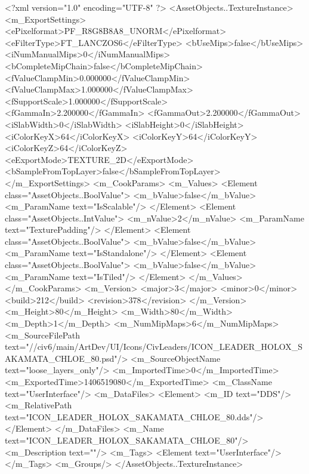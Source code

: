 <?xml version="1.0" encoding="UTF-8" ?>
<AssetObjects..TextureInstance>
	<m_ExportSettings>
		<ePixelformat>PF_R8G8B8A8_UNORM</ePixelformat>
		<eFilterType>FT_LANCZOS6</eFilterType>
		<bUseMips>false</bUseMips>
		<iNumManualMips>0</iNumManualMips>
		<bCompleteMipChain>false</bCompleteMipChain>
		<fValueClampMin>0.000000</fValueClampMin>
		<fValueClampMax>1.000000</fValueClampMax>
		<fSupportScale>1.000000</fSupportScale>
		<fGammaIn>2.200000</fGammaIn>
		<fGammaOut>2.200000</fGammaOut>
		<iSlabWidth>0</iSlabWidth>
		<iSlabHeight>0</iSlabHeight>
		<iColorKeyX>64</iColorKeyX>
		<iColorKeyY>64</iColorKeyY>
		<iColorKeyZ>64</iColorKeyZ>
		<eExportMode>TEXTURE_2D</eExportMode>
		<bSampleFromTopLayer>false</bSampleFromTopLayer>
	</m_ExportSettings>
	<m_CookParams>
		<m_Values>
			<Element class="AssetObjects..BoolValue">
				<m_bValue>false</m_bValue>
				<m_ParamName text="IsScalable"/>
			</Element>
			<Element class="AssetObjects..IntValue">
				<m_nValue>2</m_nValue>
				<m_ParamName text="TexturePadding"/>
			</Element>
			<Element class="AssetObjects..BoolValue">
				<m_bValue>false</m_bValue>
				<m_ParamName text="IsStandalone"/>
			</Element>
			<Element class="AssetObjects..BoolValue">
				<m_bValue>false</m_bValue>
				<m_ParamName text="IsTiled"/>
			</Element>
		</m_Values>
	</m_CookParams>
	<m_Version>
		<major>3</major>
		<minor>0</minor>
		<build>212</build>
		<revision>378</revision>
	</m_Version>
	<m_Height>80</m_Height>
	<m_Width>80</m_Width>
	<m_Depth>1</m_Depth>
	<m_NumMipMaps>6</m_NumMipMaps>
	<m_SourceFilePath text="//civ6/main/ArtDev/UI/Icons/CivLeaders/ICON_LEADER_HOLOX_SAKAMATA_CHLOE_80.psd"/>
	<m_SourceObjectName text="loose_layers_only"/>
	<m_ImportedTime>0</m_ImportedTime>
	<m_ExportedTime>1406519080</m_ExportedTime>
	<m_ClassName text="UserInterface"/>
	<m_DataFiles>
		<Element>
			<m_ID text="DDS"/>
			<m_RelativePath text="ICON_LEADER_HOLOX_SAKAMATA_CHLOE_80.dds"/>
		</Element>
	</m_DataFiles>
	<m_Name text="ICON_LEADER_HOLOX_SAKAMATA_CHLOE_80"/>
	<m_Description text=""/>
	<m_Tags>
		<Element text="UserInterface"/>
	</m_Tags>
	<m_Groups/>
</AssetObjects..TextureInstance>

